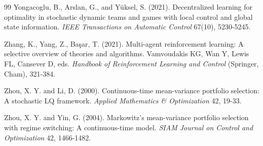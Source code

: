 \documentclass[12pt]{article}
\begin{document}
\begin{thebibliography}{99}
 Yongacoglu, B., Arslan, G., and Y\"{u}ksel, S. (2021). Decentralized learning for optimality in stochastic dynamic teams and games with local control and global state information. \emph{IEEE Transactions on Automatic Control} 67(10), 5230-5245.

 Zhang, K., Yang, Z., Ba\c{s}ar, T. (2021). Multi-agent reinforcement learning: A selective overview of theories and algorithms. Vamvoudakis KG, Wan Y, Lewis FL, Cansever D, eds. \emph{Handbook of Reinforcement Learning and Control} (Springer, Cham), 321-384.

 Zhou, X. Y. and Li, D. (2000). Continuous-time mean-variance portfolio selection: A stochastic LQ framework. \emph{Applied Mathematics \& Optimization} 42, 19-33.

 Zhou, X. Y. and Yin, G. (2004). Markowitz's mean-variance portfolio selection with regime switching: A continuous-time model. \emph{SIAM Journal on Control and Optimization} 42, 1466-1482.




\end{thebibliography}
\end{document}
